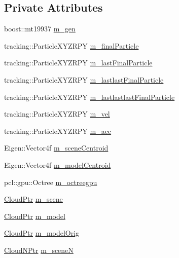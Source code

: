 \subsection*{\-Private \-Attributes}
\begin{DoxyCompactItemize}
\item 
boost\-::mt19937 \hyperlink{class_particlepose_a0449123f3b8952410023d15b202be7a5}{m\-\_\-gen}
\item 
tracking\-::\-Particle\-X\-Y\-Z\-R\-P\-Y \hyperlink{class_particlepose_ac013ac13e2a6c5a676714a4a9bccd8c1}{m\-\_\-final\-Particle}
\item 
tracking\-::\-Particle\-X\-Y\-Z\-R\-P\-Y \hyperlink{class_particlepose_a1b1424c075e6c1010d02cb558b26a1e3}{m\-\_\-last\-Final\-Particle}
\item 
tracking\-::\-Particle\-X\-Y\-Z\-R\-P\-Y \hyperlink{class_particlepose_acbd0492a1807c3e7c8be11b89549084d}{m\-\_\-lastlast\-Final\-Particle}
\item 
tracking\-::\-Particle\-X\-Y\-Z\-R\-P\-Y \hyperlink{class_particlepose_a6397839aacb6f69e3230596cfa6f79c7}{m\-\_\-lastlastlast\-Final\-Particle}
\item 
tracking\-::\-Particle\-X\-Y\-Z\-R\-P\-Y \hyperlink{class_particlepose_a524fa648db6f575f6c8891d11863d3f0}{m\-\_\-vel}
\item 
tracking\-::\-Particle\-X\-Y\-Z\-R\-P\-Y \hyperlink{class_particlepose_af03fc2a655e8d55116285f7c6b84b008}{m\-\_\-acc}
\item 
\-Eigen\-::\-Vector4f \hyperlink{class_particlepose_a15f08163cf8864a6536cb3eee81aaacd}{m\-\_\-scene\-Centroid}
\item 
\-Eigen\-::\-Vector4f \hyperlink{class_particlepose_aa5617380ebdece16240b76b515fb4fee}{m\-\_\-model\-Centroid}
\item 
pcl\-::gpu\-::\-Octree \hyperlink{class_particlepose_ab0559e3d6171dd3cec9eddb9b5992c62}{m\-\_\-octreegpu}
\item 
\hyperlink{common_8h_a36884aa4a3c181fa4c284d79329ad166}{\-Cloud\-Ptr} \hyperlink{class_particlepose_a8b8ba753e0f7624ad67097faf454d9ba}{m\-\_\-scene}
\item 
\hyperlink{common_8h_a36884aa4a3c181fa4c284d79329ad166}{\-Cloud\-Ptr} \hyperlink{class_particlepose_a392f6b998bbda4e33561669cb9a8bac0}{m\-\_\-model}
\item 
\hyperlink{common_8h_a36884aa4a3c181fa4c284d79329ad166}{\-Cloud\-Ptr} \hyperlink{class_particlepose_a2911816a0cc8e02c4190d028f32a0b9d}{m\-\_\-model\-Orig}
\item 
\hyperlink{common_8h_ac29cd61ffd2436715a9b935fe2122703}{\-Cloud\-N\-Ptr} \hyperlink{class_particlepose_a29c9f00444dd5ed1e42cdd8536873e90}{m\-\_\-scene\-N}

\end{DoxyCompactItemize}
